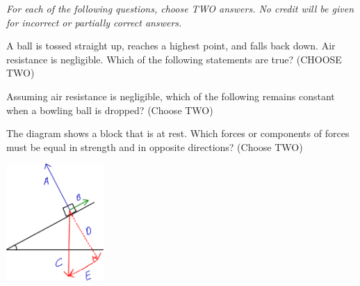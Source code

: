 \documentclass[10pt]{examdesign}
\begin{document}
\begin{multiplechoice} [title={Multiple Choice},
	rearrange=yes]
\begin{question}
\end{question}



\end{multiplechoice} 
\pagebreak
\begin{multiplechoice}[title={Multiple Correct Multiple Choice},rearrange=no]
	\textit{For each of the following questions, choose \textit{TWO} answers.  No credit will be given for incorrect or partially correct answers.}

\begin{question}
	A ball is tossed straight up, reaches a highest point, and falls back down. Air resistance is negligible.  Which of the following statements are true? (CHOOSE TWO)
\end{question}


\begin{question}
	Assuming air resistance is negligible, which of the following remains constant when a bowling ball is dropped? (Choose TWO)
\end{question}


\begin{question}
	The diagram shows a block that is at rest.  Which forces or components of forces must be equal in strength and in opposite directions? (Choose TWO)
	
	\hspace{2in}	\includegraphics[height=1.75in]{inclinedplane.png}
	
	
	
\end{question}

\end{multiplechoice}
\end{document}
